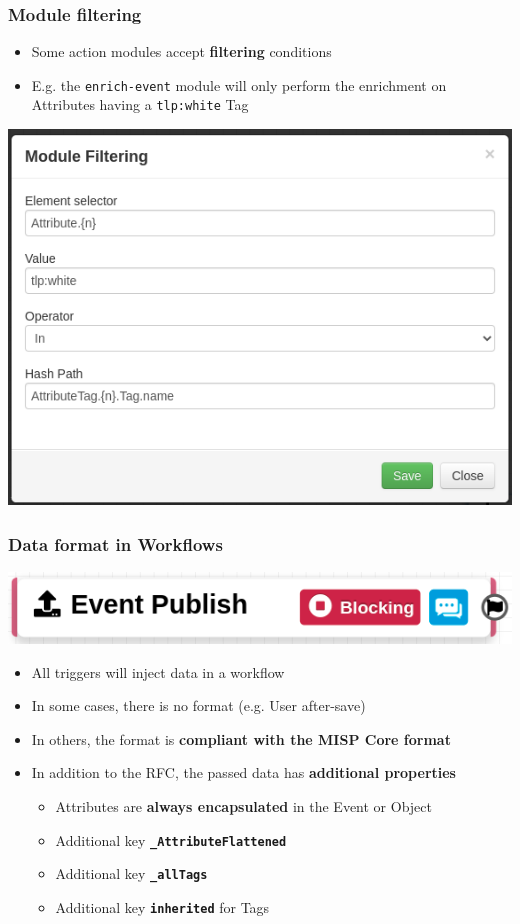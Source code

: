 \begin{frame}
    \frametitle{Module filtering}
    \begin{itemize}
        \item Some action modules accept \textbf{filtering} conditions
        \item E.g. the \texttt{enrich-event} module will only perform the enrichment on Attributes having a \texttt{tlp:white} Tag
    \end{itemize}
    \begin{center}
        \includegraphics[width=0.7\linewidth]{pictures/module-filtering.png}
    \end{center}
\end{frame}

\begin{frame}
    \frametitle{Data format in Workflows}
    \begin{center}
        \includegraphics[width=0.7\linewidth]{pictures/workflow-trigger.png}
    \end{center}
    \begin{itemize}
        \item All triggers will inject data in a workflow
        \item In some cases, there is no format (e.g. User after-save)
        \item In others, the format is \textbf{compliant with the MISP Core format}
        \item In addition to the RFC, the passed data has \textbf{additional properties}
        \begin{itemize}
            \item Attributes are \textbf{always encapsulated} in the Event or Object
            \item Additional key \textbf{\texttt{\_AttributeFlattened}}
            \item Additional key \textbf{\texttt{\_allTags}}
            \item Additional key \textbf{\texttt{inherited}} for Tags
        \end{itemize}
    \end{itemize}
\end{frame}

